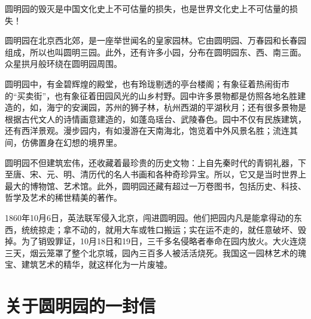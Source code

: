 \documentclass[12pt,UTF-8,openany]{ctexbook}
\begin{document}
\begin{large}
    
    圆明园的毁灭是中国文化史上不可估量的损失，也是世界文化史上不可估量的损失！
    
    圆明园在北京西北郊，是一座举世闻名的皇家园林。它由圆明园、万春园和长春园组成，所以也叫圆明三园。此外，还有许多小园，分布在圆明园东、西、南三面。众星拱月般环绕在圆明园周围。
    
    圆明园中，有金碧辉煌的殿堂，也有玲珑剔透的亭台楼阁；有象征着热闹街市的“买卖街”，也有象征着田园风光的山乡村野。园中许多景物都是仿照各地名胜建造的，如，海宁的安澜园，苏州的狮子林，杭州西湖的平湖秋月；还有很多景物是根据古代文人的诗情画意建造的，如蓬岛瑶台、武陵春色。园中不仅有民族建筑，还有西洋景观。漫步园内，有如漫游在天南海北，饱览着中外风景名胜；流连其间，仿佛置身在幻想的境界里。
    
    圆明园不但建筑宏伟，还收藏着最珍贵的历史文物：上自先秦时代的青铜礼器，下至唐、宋、元、明、清历代的名人书画和各种奇珍异宝。所以，它又是当时世界上最大的博物馆、艺术馆。此外，圆明园还藏有超过一万卷图书，包括历史、科技、哲学及艺术的稀世精美的著作。
    
    1860年10月6日，英法联军侵入北京，闯进圆明园。他们把园内凡是能拿得动的东西，统统掠走；拿不动的，就用大车或牲口搬运；实在运不走的，就任意破坏、毁掉。为了销毁罪证，10月18日和19日，三千多名侵略者奉命在园内放火。大火连烧三天，烟云笼罩了整个北京城，园內三百多人被活活烧死。我国这一园林艺术的瑰宝、建筑艺术的精华，就这样化为一片废墟。
    
\end{large}



\chapter{关于圆明园的一封信}
\end{document}
